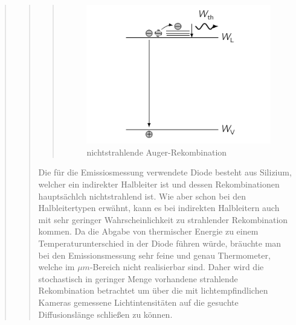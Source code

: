 \begin{quote}
\begin{quote}
\begin{quote}
            \begin{figure}[H]
                    \centering
                        \includegraphics[scale=0.72, trim = 1cm 1cm 1.5cm 0cm,
                        clip]{./Emissionsbilder/restliches/auger.png}
                        \caption{nichtstrahlende Auger-Rekombination}
                            \label{fig:./Emissionsbilder/restliches/auger.png}
            \end{figure}
            
            \end{quote}
        
        Die für die Emissiosmessung verwendete Diode besteht aus Silizium,
        welcher ein indirekter Halbleiter ist und dessen Rekombinationen
        hauptsächlch nichtstrahlend ist. Wie aber schon bei den Halbleitertypen
        erwähnt, kann es bei indirekten Halbleitern auch mit sehr geringer
        Wahrscheinlichkeit zu strahlender Rekombination kommen. Da die Abgabe
        von thermischer Energie zu einem Temperaturunterschied in der Diode
        führen würde, bräuchte man bei den Emissionsmessung sehr feine und genau
        Thermometer, welche im $\mu m$-Bereich nicht realisierbar sind. Daher
        wird die stochastisch in geringer Menge vorhandene strahlende
        Rekombination betrachtet um über die mit lichtempfindlichen
        Kameras gemessene Lichtintensitäten auf die gesuchte Diffusionslänge
        schließen zu können.
        \end{quote}
    
    
    
    
\end{quote} %




